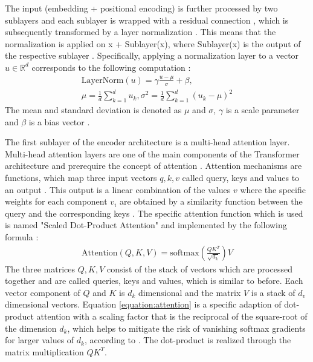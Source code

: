 \par
The input (embedding + positional encoding) is further processed by two sublayers and each sublayer is wrapped with a residual connection \citep{He2016}, which is subsequently transformed by a layer normalization \citep{Ba2016}.
This means that the normalization is applied on x + Sublayer(x), where Sublayer(x) is the output of the respective sublayer \citep{Vaswani2017}.
Specifically, applying a normalization layer to a vector $u\in \mathbb{R}^d$ corresponds to the following computation \citep{Ba2016,Xiong2020}:
\begin{align}
	\text{LayerNorm}(u) = \gamma \frac{u-\mu}{\sigma}+\beta,\\
	\mu = \frac{1}{d}\sum_{k=1}^{d}u_k, \sigma^2 = \frac{1}{d}\sum_{k=1}^{d}(u_k - \mu)^2
\end{align}
The mean and standard deviation is denoted as $\mu$ and $\sigma$, $\gamma$ is a scale parameter and $\beta$ is a bias vector \citep{Xiong2020}.
\par
The first sublayer of the encoder architecture is a multi-head attention layer.   
Multi-head attention layers are one of the main components of the Transformer architecture and prerequire the concept of attention \citep{Vaswani2017}.
Attention mechanisms are functions, which map three input vectors $q,k,v$ called query, keys and values to an output \citep{Vaswani2017}.
This output is a linear combination of the values $v$ where the specific weights for each component $v_i$ are obtained by a similarity function between the query and the corresponding keys \citep{Vaswani2017}.
The specific attention function which is used is named "Scaled Dot-Product Attention" and implemented by the following formula \citep{Vaswani2017}:
\begin{align}
    \text{Attention}(Q,K,V) = \text{softmax}(\frac{QK^T}{\sqrt{d_k}})V
	\label{equation:attention}
\end{align}
The three matrices $Q,K,V$ consist of the stack of vectors which are processed together and are called queries, keys and values, which is similar to before.
Each vector component of $Q$ and $K$ is $d_k$ dimensional and the matrix $V$ is a stack of $d_v$ dimensional vectors.
Equation \ref{equation:attention} is a specific adaption of dot-product attention with a scaling factor that is the reciprocal of the square-root of the dimension $d_k$, which helps to mitigate the risk of vanishing softmax gradients for larger values of $d_k$, according to \citep{Vaswani2017}.
The dot-product is realized through the matrix multiplication $QK^T$.
